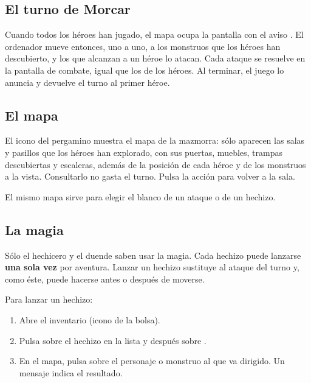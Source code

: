 \subsection{El turno de Morcar}

Cuando todos los héroes han jugado, el mapa ocupa la pantalla con el aviso
. El ordenador mueve entonces, uno a uno, a los
monstruos que los héroes han descubierto, y los que alcanzan a un héroe lo
atacan. Cada ataque se resuelve en la pantalla de combate, igual que los de
los héroes. Al terminar, el juego lo anuncia y devuelve el turno al primer
héroe.


\subsection{El mapa}

El icono del pergamino muestra el mapa de la mazmorra: sólo aparecen las
salas y pasillos que los héroes han explorado, con sus puertas, muebles,
trampas descubiertas y escaleras, además de la posición de cada héroe y de
los monstruos a la vista. Consultarlo no gasta el turno. Pulsa la acción
para volver a la sala.

El mismo mapa sirve para elegir el blanco de un ataque o de un hechizo.

\subsection{La magia}

Sólo el hechicero y el duende saben usar la magia. Cada hechizo puede
lanzarse \textbf{una sola vez} por aventura. Lanzar un hechizo sustituye al
ataque del turno y, como éste, puede hacerse antes o después de moverse.

Para lanzar un hechizo:

\begin{enumerate}
\item Abre el inventario (icono de la bolsa).
\item Pulsa sobre el hechizo en la lista  y después sobre
  .
\item En el mapa, pulsa sobre el personaje o monstruo al que va dirigido.
  Un mensaje indica el resultado.
\end{enumerate}


